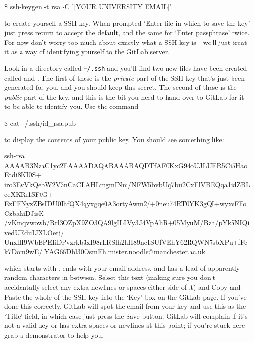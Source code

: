 \begin{ttoutenv}
\$ ssh-keygen -t rsa -C '[YOUR UNIVERSITY EMAIL]'
\end{ttoutenv}

to create yourself a SSH key. When prompted `Enter file in which to save the key' just press return to accept the default, and the same for `Enter passphrase' twice.  For now don't worry too much about exactly what a SSH key is---we'll just treat it as a way of identifying yourself to the GitLab server. 

Look in a directory called \verb!~/.ssh! and you'll find two new files have been created called  and . The first of these is the \textit{private} part of the SSH key that's just been generated for you, and you should keep this secret. The second of these is the \textit{public} part of the key, and this is the bit you need to hand over to GitLab for it to be able to identify you. Use the command

\begin{ttoutenv}
\$ cat ~/.ssh/id_rsa.pub
\end{ttoutenv}
to display the contents of your public key. You should see something like:

\begin{ttoutenv}
  
  ssh-rsa  AAAAB3NzaC1yc2EAAAADAQABAAABAQDTfAF0KxG94oUJLUER5Ci5HaoEtdi8KI0S+
  iro3EvVkQebW2V3nCaCLAHLmgmINm/NFW5bvbUq7bu2CxFlVBEQqa1idZBLceXKRi1SFtG+
  EzFENyzZBsIDU0IhfQX4qyxgqe0A3ortyAwm2/+0neu74RT0YK3gQI+wyxsFFoCzbahiDJisK
  /vKmqvwowb/Rrl3OZpX9ZO3QA9lgILLVy3J4VpAhR+05MyuM/Bzh/pYk5NIQivedUEduIJXLOetj/
  UnxlH9WbEPEIiDPvzrkb3xI98rLRSlh2hH89nc1SUfVEhY62RQWN7sbXPu+fFck7Dom9wE/
  YAG66Dbl30OsmFh mister.noodle@manchester.ac.uk

\end{ttoutenv}

which starts with , ends with your email address, and has a load of apparently random characters in between. Select this text (making sure you don't accidentally select any extra newlines or spaces either side of it) and 
Copy and Paste the whole of the SSH key into the `Key' box on the GitLab page. If you've done this correctly, GitLab will spot the email from your key and use this as the `Title' field, in which case just press the Save button. GitLab will complain if it's not a valid key or has extra spaces or newlines at this point; if you're stuck here grab a demonstrator to help you. 

